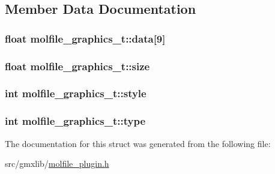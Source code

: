 \subsection{\-Member \-Data \-Documentation}
\hypertarget{structmolfile__graphics__t_a318d4546a3d423317a4a40a2a03458f3}{
\subsubsection[{data}]{\setlength{\rightskip}{0pt plus 5cm}float {\bf molfile\-\_\-graphics\-\_\-t\-::data}\mbox{[}9\mbox{]}}}\label{structmolfile__graphics__t_a318d4546a3d423317a4a40a2a03458f3}
\hypertarget{structmolfile__graphics__t_a86757f8482e21fd16d06c72155f4f166}{
\subsubsection[{size}]{\setlength{\rightskip}{0pt plus 5cm}float {\bf molfile\-\_\-graphics\-\_\-t\-::size}}}\label{structmolfile__graphics__t_a86757f8482e21fd16d06c72155f4f166}
\hypertarget{structmolfile__graphics__t_aa349ed7acdfcc222d68688afa0fd067d}{
\subsubsection[{style}]{\setlength{\rightskip}{0pt plus 5cm}int {\bf molfile\-\_\-graphics\-\_\-t\-::style}}}\label{structmolfile__graphics__t_aa349ed7acdfcc222d68688afa0fd067d}
\hypertarget{structmolfile__graphics__t_a501b87407c7f2b5b6bb47c714af4257f}{
\subsubsection[{type}]{\setlength{\rightskip}{0pt plus 5cm}int {\bf molfile\-\_\-graphics\-\_\-t\-::type}}}\label{structmolfile__graphics__t_a501b87407c7f2b5b6bb47c714af4257f}


\-The documentation for this struct was generated from the following file\-:\begin{DoxyCompactItemize}
\item 
src/gmxlib/\hyperlink{molfile__plugin_8h}{molfile\-\_\-plugin.\-h}\end{DoxyCompactItemize}
